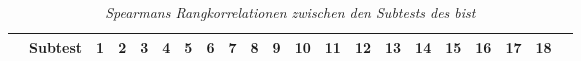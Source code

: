 \documentclass[11pt, twoside, a4paper]{book}		%
\begin{document}
\begin{sidewaystable}
	
	
	\begin{adjustbox}{width=1\textwidth,totalheight=1\textheight,keepaspectratio}
		
		\begin{threeparttable}
			\captionsetup{labelsep = none}
			\caption[Zusammenhänge zwischen den Subtests]{\newline  \textit{Spearmans Rangkorrelationen zwischen den Subtests des \gls{bist}} \vspace{.2cm}}
			\label{tab:subtestsCorr}
			
			\begin{tabular}{
					c
					c
					S[table-format = 0.2, add-integer-zero=false]
					S[table-format = 0.2, add-integer-zero=false]
					S[table-format = 0.2, add-integer-zero=false]
					S[table-format = 0.2, add-integer-zero=false]
					S[table-format = 0.2, add-integer-zero=false]
					S[table-format = 0.2, add-integer-zero=false]
					S[table-format = 0.2, add-integer-zero=false]
					S[table-format = 0.2, add-integer-zero=false]
					S[table-format = 0.2, add-integer-zero=false]
					S[table-format = 0.2, add-integer-zero=false]
					S[table-format = 0.2, add-integer-zero=false]
					S[table-format = 0.2, add-integer-zero=false]
					S[table-format = 0.2, add-integer-zero=false]
					S[table-format = 0.2, add-integer-zero=false]
					S[table-format = 0.2, add-integer-zero=false]
					S[table-format = 0.2, add-integer-zero=false]
					S[table-format = 0.2, add-integer-zero=false]
					S[table-format = 0.2, add-integer-zero=false]
					>{\centering\arraybackslash}p{1.2cm}
				}
				\hline
				&	{Subtest}&	{1}	&	{2}	&	{3}	&	{4}	&	{5}	&	{6}	&	{7}	&	{8}	&	{9}	&	{10}&	{11}&	{12}&	{13}&	{14}&	{15}&	{16}&	{17}&	{18}	\\
				\hline
				

\end{tabular}
\end{threeparttable}
\end{adjustbox}
\end{sidewaystable}
\end{document}
